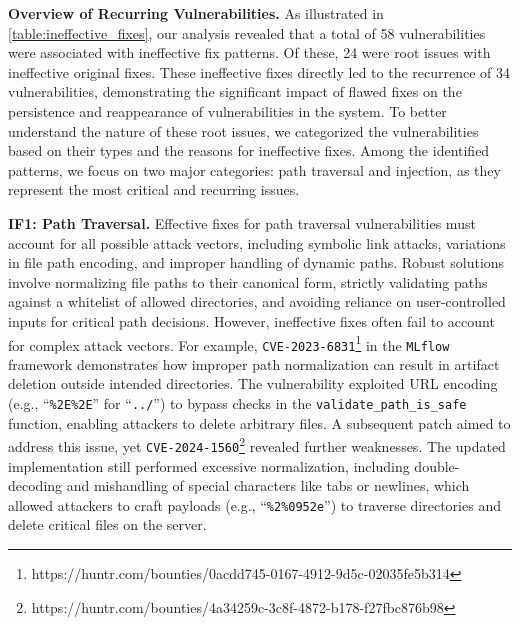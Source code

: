 \noindent \textbf{Overview of Recurring Vulnerabilities.} 
As illustrated in \autoref{table:ineffective_fixes}, our analysis revealed that a total of 58 vulnerabilities were associated with ineffective fix patterns. Of these, 24 were root issues with ineffective original fixes. These ineffective fixes directly led to the recurrence of 34 vulnerabilities, demonstrating the significant impact of flawed fixes on the persistence and reappearance of vulnerabilities in the system. To better understand the nature of these root issues, we categorized the vulnerabilities based on their types and the reasons for ineffective fixes. Among the identified patterns, we focus on two major categories: path traversal and injection, as they represent the most critical and recurring issues.

\noindent \textbf{IF1: Path Traversal.}  
Effective fixes for path traversal vulnerabilities must account for all possible attack vectors, including symbolic link attacks, variations in file path encoding, and improper handling of dynamic paths. Robust solutions involve normalizing file paths to their canonical form, strictly validating paths against a whitelist of allowed directories, and avoiding reliance on user-controlled inputs for critical path decisions. However, ineffective fixes often fail to account for complex attack vectors. For example, \texttt{CVE-2023-6831}\footnote{https://huntr.com/bounties/0acdd745-0167-4912-9d5c-02035fe5b314} in the \texttt{MLflow} framework demonstrates how improper path normalization can result in artifact deletion outside intended directories. The vulnerability exploited URL encoding (e.g., ``\texttt{\%2E\%2E}'' for ``\texttt{../}'') to bypass checks in the \texttt{validate\_path\_is\_safe} function, enabling attackers to delete arbitrary files. A subsequent patch aimed to address this issue, yet \texttt{CVE-2024-1560}\footnote{https://huntr.com/bounties/4a34259c-3c8f-4872-b178-f27fbc876b98} revealed further weaknesses. The updated implementation still performed excessive normalization, including double-decoding and mishandling of special characters like tabs or newlines, which allowed attackers to craft payloads (e.g., ``\texttt{\%2\%0952e}'') to traverse directories and delete critical files on the server.


